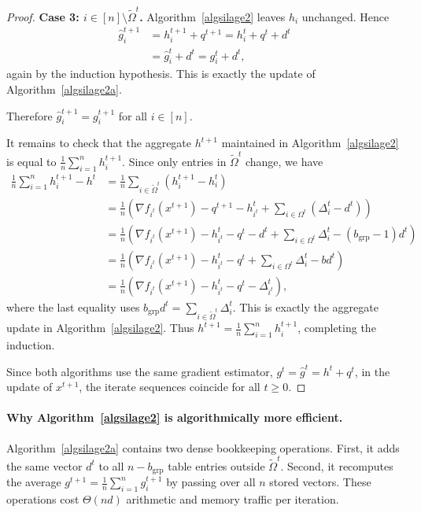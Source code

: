 \documentclass{article}
\newcommand{\rb}[1]{\left(#1\right)}
\theoremstyle{plain}
\begin{document}
\begin{proof}
\smallskip
\noindent\textbf{Case 3: $i\in[n]\setminus\tilde{\Omega}^t$.}
Algorithm~\ref{algsilage2} leaves $h_i$ unchanged.
Hence
\begin{align*}
\widehat g_i^{t+1}
&=
h_i^{t+1}+q^{t+1}
=
h_i^t+q^t+d^t
\\
&=
\widehat g_i^t+d^t
=
g_i^t+d^t,
\end{align*}
again by the induction hypothesis.
This is exactly the update of Algorithm~\ref{algsilage2a}.

Therefore $\widehat g_i^{t+1}=g_i^{t+1}$ for all $i\in[n]$.

It remains to check that the aggregate $h^{t+1}$ maintained in Algorithm~\ref{algsilage2} is equal to $\frac1n\sum_{i=1}^n h_i^{t+1}$.
Since only entries in $\tilde{\Omega}^t$ change, we have
\begin{align*}
\frac1n\sum_{i=1}^n h_i^{t+1}-h^t
&=
\frac1n\sum_{i\in\tilde{\Omega}^t}\rb{h_i^{t+1}-h_i^t}
\\
&=
\frac1n\rb{
\nabla f_{i^t}(x^{t+1})-q^{t+1}-h_{i^t}^t
+
\sum_{i\in\Omega^t}\rb{\Delta_i^t-d^t}
}
\\
&=
\frac1n\rb{
\nabla f_{i^t}(x^{t+1})-h_{i^t}^t-q^t-d^t
+
\sum_{i\in\Omega^t}\Delta_i^t
-
(b_{\mathrm{grp}}-1)d^t
}
\\
&=
\frac1n\rb{
\nabla f_{i^t}(x^{t+1})-h_{i^t}^t-q^t
+
\sum_{i\in\Omega^t}\Delta_i^t
-
bd^t
}
\\
&=
\frac1n\rb{
\nabla f_{i^t}(x^{t+1})-h_{i^t}^t-q^t-\Delta_{i^t}^t
},
\end{align*}
where the last equality uses $b_{\mathrm{grp}}d^t=\sum_{i\in\tilde{\Omega}^t}\Delta_i^t$.
This is exactly the aggregate update in Algorithm~\ref{algsilage2}.
Thus $h^{t+1}=\frac1n\sum_{i=1}^n h_i^{t+1}$, completing the induction.

Since both algorithms use the same gradient estimator, $g^t=\widehat g^t=h^t+q^t$, in the update of $x^{t+1}$, the iterate sequences coincide for all $t\ge 0$.
\end{proof}

\paragraph*{Why Algorithm~\ref{algsilage2} is algorithmically more efficient.}
Algorithm~\ref{algsilage2a} contains two dense bookkeeping operations.
First, it adds the same vector $d^t$ to all $n-b_{\mathrm{grp}}$ table entries outside $\tilde{\Omega}^t$.
Second, it recomputes the average $g^{t+1}=\frac1n\sum_{i=1}^n g_i^{t+1}$ by passing over all $n$ stored vectors.
These operations cost $\Theta(nd)$ arithmetic and memory traffic per iteration.
\end{document}

